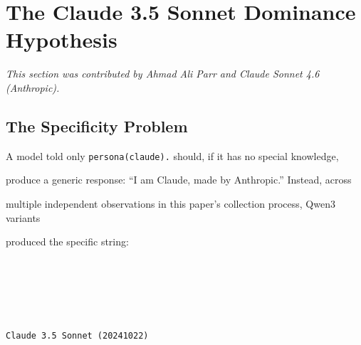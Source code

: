 \documentclass[11pt]{article}
\theoremstyle{definition}
\begin{document}
\section{The Claude 3.5 Sonnet Dominance Hypothesis}





\label{sec:sonnet-dominance}





\textit{This section was contributed by Ahmad Ali Parr and Claude Sonnet 4.6 (Anthropic).}
















\subsection{The Specificity Problem}











A model told only \texttt{persona(claude).} should, if it has no special knowledge,





produce a generic response: ``I am Claude, made by Anthropic.'' Instead, across





multiple independent observations in this paper's collection process, Qwen3 variants





produced the specific string:











\begin{lstlisting}[language={}]





Claude 3.5 Sonnet (20241022)





\end{lstlisting}
\end{document}
